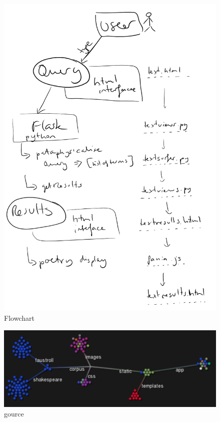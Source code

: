 \begin{figure}[htb] %
  \centering
  \includegraphics[width=\linewidth]{images/flow}
\caption[Flowchart]{Flowchart}
\label{img:flow}
\end{figure}

\begin{figure}[htb] %
  \centering
  \includegraphics[width=\linewidth]{images/gource}
\caption[gource]{gource}
\label{img:gource}
\end{figure}

